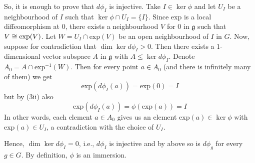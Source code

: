 \documentclass[a4paper, 12pt]{article}
\begin{document}
\begin{Exercise}
\begin{enumerate}[label=(\roman*)]
\begin{itemize}
                    So, it is enough to prove that $d\phi_I$ is injective.
                    Take $I \in \ker\phi$ and let $U_I$ be a neighbourhood of $I$ such that $\ker\phi \cap U_I = \lbrace I \rbrace$.
                    Since $\text{exp}$ is a local diffeomorphism at $0$, there exists a neighbourhood $V$ for $0$ in $\mathfrak{g}$ such that $V \cong \text{exp}(V)$.
                    Let $W = U_I \cap \text{exp}(V)$ be an open neighbourhood of $I$ in $G$.
                    Now, suppose for contradiction that $\dim\ker d\phi_I > 0$.
                    Then there exists a $1$-dimensional vector subspace $A$ in $\mathfrak{g}$ with $A \leq \ker d\phi_I$.
                    Denote $A_0 = A \cap \text{exp}^{-1}(W)$.
                    Then for every point $a \in A_0$ (and there is infinitely many of them) we get
                    \[
                        \text{exp}(d\phi_I(a)) = \text{exp}(0) = I
                    \]
                    but by (3ii) also
                    \[
                        \text{exp}(d\phi_I(a)) = \phi(\text{exp}(a)) = I
                    \]
                    In other words, each element $a \in A_0$ gives us an element $\text{exp}(a) \in \ker\phi$ with $\text{exp}(a) \in U_I$,
                    a contradiction with the choice of $U_I$.

                    Hence, $\dim\ker d\phi_I = 0$, i.e., $d\phi_I$ is injective and by above so is $d\phi_g$ for every $g \in G$.
                    By definition, $\phi$ is an immersion.
            \end{itemize}
    \end{enumerate}
\end{Exercise}
\end{document}
